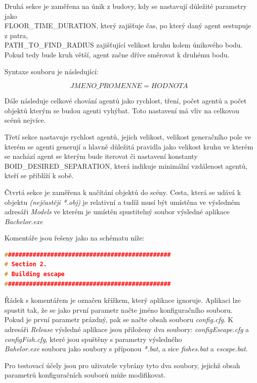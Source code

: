 \documentclass[czech,public,dept460,male,cpdeclaration]{diploma}
\begin{document}
Druhá sekce je zaměřena na únik z budovy, kdy se nastavují důležité parametry jako \\FLOOR\_TIME\_DURATION, který zajišťuje čas, po který daný agent sestupuje z patra, \\PATH\_TO\_FIND\_RADIUS zajišťující velikost kruhu kolem únikového bodu. Pokud tedy bude kruh větší, agent začne dříve směrovat k druhému bodu.

Syntaxe souboru je následující:

\[JMENO\_PROMENNE=HODNOTA\]

Dále následuje celkové chování agentů jako rychlost, tření, počet agentů a počet objektů kterým se budou agenti vyhýbat. Toto nastavení má vliv na celkovou scénů nejvíce.

Třetí sekce nastavuje rychlost agentů, jejich velikost, velikost generačního pole ve kterém se agenti generují a hlavně důležitá pravidla jako velikost kruhu ve kterém se nachází agent se kterým bude iterovat či nastavení konstanty BOID\_DESIRED\_SEPARATION, která indikuje minimální vzdálenost agentů, kteří se přiblíží k sobě.

Čtvrtá sekce je zaměřena k načítání objektů do scény. Cesta, která se udává k objektu \textit{(nejčastěji *.obj)} je relativní a tudíž musí být umístěna ve výsledném adresáři \textit{Models} ve kterém je umístěn spustitelný soubor výsledné aplikace \textit{Bachelor.exe}

Komentáře jsou řešeny jako na schématu níže:


\begin{lstlisting}[language=c++,label=src:seek,caption=Ukázka komentáře v konfiguračním souboru]
###############################################
# Section 2. 
# Building escape
###############################################
\end{lstlisting}

Řádek s komentářem je označen křížkem, který  aplikace ignoruje. Aplikaci lze spustit tak, že se jako první parametr načte jméno konfiguračního souboru. Pokud je první parametr prázdný, pak se načte obsah souboru \textit{config.cfg}. K adresáři \textit{Release} výsledné aplikace jsou přiloženy dva soubory: \textit{configEscape.cfg} a \textit{configFish.cfg}, které jsou spuštěny s parametry výsledného \\\textit{Bahelor.exe} souboru jako soubory s příponou \textit{*.bat}, a sice \textit{fishes.bat} a \textit{escape.bat}. 

Pro testovací účely jsou pro uživatele vybrány tyto dva soubory, jejichž obsah parametrů konfiguračních souborů může modifikovat.
\end{document}
